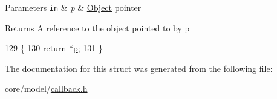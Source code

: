 \begin{DoxyParams}[1]{Parameters}
\mbox{\tt in}  & {\em p} & \hyperlink{classns3_1_1Object}{Object} pointer \\
\hline
\end{DoxyParams}
\begin{DoxyReturn}{Returns}
A reference to the object pointed to by p 
\end{DoxyReturn}

\begin{DoxyCode}
129   \{
130     \textcolor{keywordflow}{return} *\hyperlink{lte__link__budget_8m_ac9de518908a968428863f829398a4e62}{p};
131   \}
\end{DoxyCode}


The documentation for this struct was generated from the following file\+:\begin{DoxyCompactItemize}
\item 
core/model/\hyperlink{callback_8h}{callback.\+h}\end{DoxyCompactItemize}
